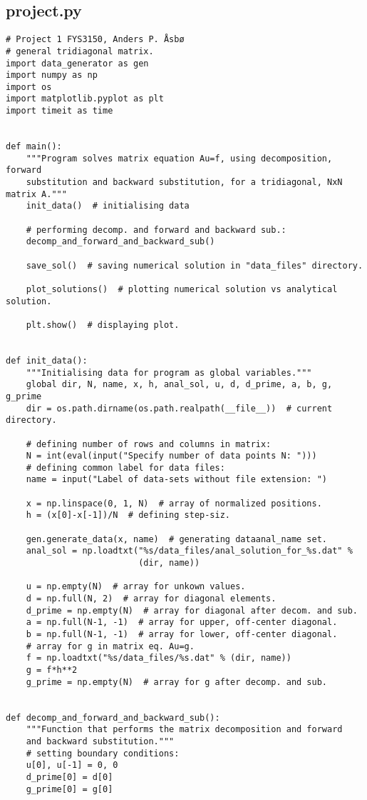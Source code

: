 \documentclass[english,notitlepage]{revtex4-1}  %
\begin{document}
\subsection{project.py}\label{A:11}
\begin{lstlisting}
# Project 1 FYS3150, Anders P. Åsbø
# general tridiagonal matrix.
import data_generator as gen
import numpy as np
import os
import matplotlib.pyplot as plt
import timeit as time


def main():
    """Program solves matrix equation Au=f, using decomposition, forward
    substitution and backward substitution, for a tridiagonal, NxN matrix A."""
    init_data()  # initialising data

    # performing decomp. and forward and backward sub.:
    decomp_and_forward_and_backward_sub()

    save_sol()  # saving numerical solution in "data_files" directory.

    plot_solutions()  # plotting numerical solution vs analytical solution.

    plt.show()  # displaying plot.


def init_data():
    """Initialising data for program as global variables."""
    global dir, N, name, x, h, anal_sol, u, d, d_prime, a, b, g, g_prime
    dir = os.path.dirname(os.path.realpath(__file__))  # current directory.

    # defining number of rows and columns in matrix:
    N = int(eval(input("Specify number of data points N: ")))
    # defining common label for data files:
    name = input("Label of data-sets without file extension: ")

    x = np.linspace(0, 1, N)  # array of normalized positions.
    h = (x[0]-x[-1])/N  # defining step-siz.

    gen.generate_data(x, name)  # generating dataanal_name set.
    anal_sol = np.loadtxt("%s/data_files/anal_solution_for_%s.dat" %
                          (dir, name))

    u = np.empty(N)  # array for unkown values.
    d = np.full(N, 2)  # array for diagonal elements.
    d_prime = np.empty(N)  # array for diagonal after decom. and sub.
    a = np.full(N-1, -1)  # array for upper, off-center diagonal.
    b = np.full(N-1, -1)  # array for lower, off-center diagonal.
    # array for g in matrix eq. Au=g.
    f = np.loadtxt("%s/data_files/%s.dat" % (dir, name))
    g = f*h**2
    g_prime = np.empty(N)  # array for g after decomp. and sub.


def decomp_and_forward_and_backward_sub():
    """Function that performs the matrix decomposition and forward
    and backward substitution."""
    # setting boundary conditions:
    u[0], u[-1] = 0, 0
    d_prime[0] = d[0]
    g_prime[0] = g[0]


\end{lstlisting}
\end{document}
